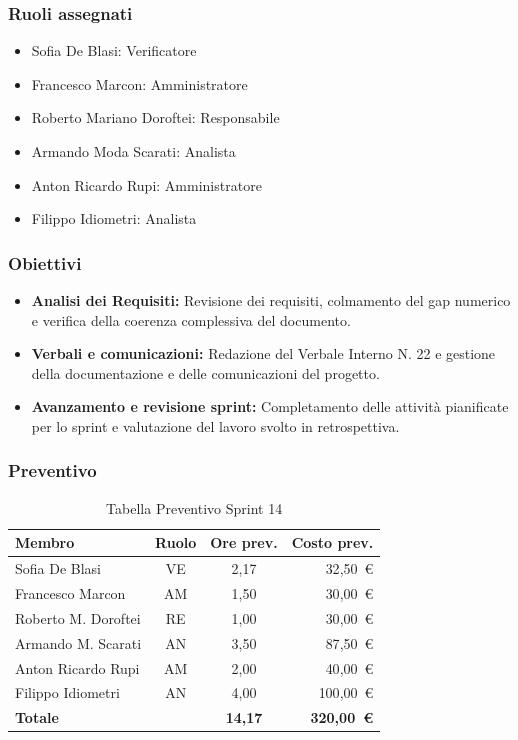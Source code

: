 \subsubsection{Ruoli assegnati}
\begin{itemize}
    \item Sofia De Blasi: Verificatore
    \item Francesco Marcon: Amministratore
    \item Roberto Mariano Doroftei: Responsabile
    \item Armando Moda Scarati: Analista
    \item Anton Ricardo Rupi: Amministratore
    \item Filippo Idiometri: Analista
\end{itemize}

\subsubsection{Obiettivi}
\begin{itemize}
    \item \textbf{Analisi dei Requisiti:} Revisione dei requisiti, colmamento del gap numerico e verifica della coerenza complessiva del documento.
    \item \textbf{Verbali e comunicazioni:} Redazione del Verbale Interno N. 22 e gestione della documentazione e delle comunicazioni del progetto.
    \item \textbf{Avanzamento e revisione sprint:} Completamento delle attività pianificate per lo sprint e valutazione del lavoro svolto in retrospettiva.
\end{itemize}

\subsubsection{Preventivo}
\begin{table}[H]
    \centering
    \renewcommand{\arraystretch}{1.3}
    \begin{tabularx}{\textwidth}{|X|c|c|r|}
        \hline
        \textbf{Membro} & \textbf{Ruolo} & \textbf{Ore prev.} & \textbf{Costo prev.} \\
        \hline
        Sofia De Blasi       & VE & 2,17 & 32{,}50~\euro \\
        Francesco Marcon     & AM & 1,50 & 30{,}00~\euro \\
        Roberto M. Doroftei  & RE & 1,00 & 30{,}00~\euro \\
        Armando M. Scarati   & AN & 3,50 & 87{,}50~\euro \\
        Anton Ricardo Rupi   & AM & 2,00 & 40{,}00~\euro \\
        Filippo Idiometri    & AN & 4,00 & 100{,}00~\euro \\
        \hline
        \textbf{Totale}      &    & \textbf{14,17} & \textbf{320{,}00~\euro} \\
        \hline
    \end{tabularx}
    \caption{Tabella Preventivo Sprint 14} 
\end{table}

